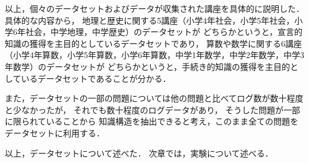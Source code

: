 以上，個々のデータセットおよびデータが収集された講座を具体的に説明した．
具体的な内容から，
地理と歴史に関する5講座（小学4年社会，小学5年社会，小学6年社会，中学地理，中学歴史）のデータセットが
どちらかというと，宣言的知識の獲得を主目的としているデータセットであり，
算数や数学に関する6講座（小学4年算数，小学5年算数，小学6年算数，中学1年数学，中学2年数学，中学3年数学）のデータセットが
どちらかというと，手続き的知識の獲得を主目的としているデータセットであることが分かる．


また，データセットの一部の問題については他の問題と比べてログ数が数十程度と少なかったが，
それでも数十程度のログデータがあり，
そうした問題が一部に限られていることから
知識構造を抽出できると考え，このまま全ての問題をデータセットに利用する．


\vvspace
以上，データセットについて述べた．
次章では，実験について述べる．

